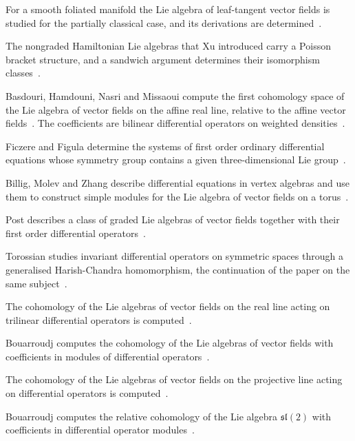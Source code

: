 For a smooth foliated manifold the Lie algebra of leaf-tangent vector fields
is studied for the partially classical case, and its derivations are
determined~\cite{WlSomeLieAlgebras1981}.

The nongraded Hamiltonian Lie algebras that Xu introduced carry a Poisson
bracket structure, and a sandwich argument determines their isomorphism
classes~\cite{WlPoissonBracketsAnd2003}.

Basdouri, Hamdouni, Nasri and Missaoui compute the first cohomology space of
the Lie algebra of vector fields on the affine real line, relative to the
affine vector fields~\cite{WlFirstCohomologyOfTheLieAlgebra2020}. The coefficients are bilinear differential operators on
weighted densities~\cite{WlFirstCohomologyOfTheLieAlgebra2020}.

Ficzere and Figula determine the systems of first order ordinary differential
equations whose symmetry group contains a given three-dimensional Lie
group~\cite{WlSystemsOfFirstOrderOrdinaryDif2020}.

Billig, Molev and Zhang describe differential equations in vertex algebras and
use them to construct simple modules for the Lie algebra of vector fields on a
torus~\cite{WlBilligYMolevAZhangRDifferentia2020}.

Post describes a class of graded Lie algebras of vector fields together with
their first order differential
operators~\cite{WlAClassOfGradedLieAlgebrasOfVec2020}.

Torossian studies invariant differential operators on symmetric spaces through
a generalised Harish-Chandra homomorphism, the continuation of the paper on
the same subject~\cite{WlInvariantDifferentialOperators2020}.

The cohomology of the Lie algebras of vector fields on the real line acting on
trilinear differential operators is
computed~\cite{WlCohomologyOfTheVectorFieldsLie2020}.

Bouarroudj computes the cohomology of the Lie algebras of vector fields with
coefficients in modules of differential
operators~\cite{WlBouarroudjSofianeCohomologyOfT2020}.

The cohomology of the Lie algebras of vector fields on the projective line
acting on differential operators is
computed~\cite{WlCohomologyOfTheVectorFieldsLie2020}.

Bouarroudj computes the relative cohomology of the Lie algebra
$\mathfrak{sl}(2)$ with coefficients in differential operator
modules~\cite{WlBouarroudjSOnMathfrakSl2Relati2020}.

